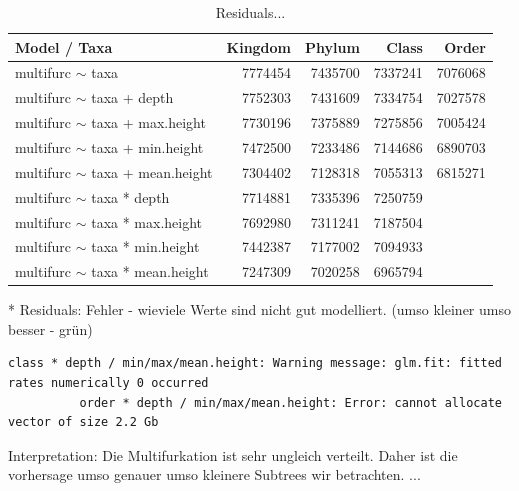         \begin{table}[h]
          \begin{center}
            \begin{tabular}{ |l|r|r|r|r| }
              \hline
              Model / Taxa & Kingdom & Phylum & Class & Order \\
              \hline \hline
              multifurc $\sim$ taxa & 7774454 & 7435700 & 7337241 & 7076068 \\
              \hline
              multifurc $\sim$ taxa + depth & 7752303 & 7431609 & 7334754 & 7027578 \\
              multifurc $\sim$ taxa + max.height & 7730196 & 7375889 & 7275856 & 7005424 \\
              multifurc $\sim$ taxa + min.height & 7472500 & 7233486 & 7144686 & \cellcolor{green!50}6890703 \\
              multifurc $\sim$ taxa + mean.height & 7304402 & 7128318 & 7055313 & \cellcolor{green!50}6815271 \\
              \hline
              multifurc $\sim$ taxa * depth & 7714881 & 7335396 & 7250759 & \\
              multifurc $\sim$ taxa * max.height & 7692980 & 7311241 & 7187504 & \\
              multifurc $\sim$ taxa * min.height & 7442387 & 7177002 & 7094933 & \\
              multifurc $\sim$ taxa * mean.height & 7247309 & 7020258 & \cellcolor{green!50}6965794 & \\
              \hline
            \end{tabular} 
          \end{center}
          \caption{Residuals...}
          \label{table:...} 
        \end{table}
        * Residuals: Fehler - wieviele Werte sind nicht gut modelliert. (umso kleiner umso besser - grün) \\
        
        \begin{lstlisting}[gobble=8]
          class * depth / min/max/mean.height: Warning message: glm.fit: fitted rates numerically 0 occurred
          order * depth / min/max/mean.height: Error: cannot allocate vector of size 2.2 Gb
        \end{lstlisting}

        Interpretation: Die Multifurkation ist sehr ungleich verteilt. Daher ist die vorhersage umso 
          genauer umso kleinere Subtrees wir betrachten. ...
        

